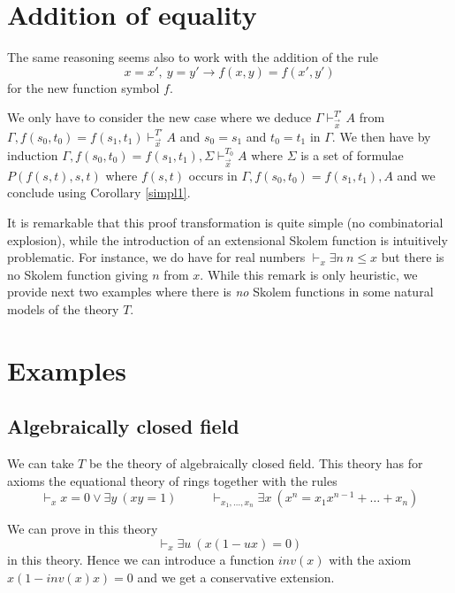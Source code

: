 \documentclass[10pt,a4paper]{article}
\begin{document}

\section{Addition of equality}

 The same reasoning seems also to work with the addition of the rule
$$x=x',~ y = y'\rightarrow f(x,y) = f(x',y')$$
for the new function symbol $f$.

 We only have to consider the new case where we deduce $\Gamma\vdash_{\vec{x}}^{T'} A$ from 
$\Gamma,f(s_0,t_0) = f(s_1,t_1)\vdash_{\vec{x}}^{T'} A$ and $s_0 = s_1$ and
$t_0 = t_1$ in $\Gamma$. We then have by induction
$\Gamma,f(s_0,t_0) = f(s_1,t_1),\Sigma \vdash_{\vec{x}}^{T_0} A$
where  $\Sigma$ is a set of formulae $P(f(s,t),s,t)$ where $f(s,t)$ occurs
in $\Gamma,f(s_0,t_0) = f(s_1,t_1),A$ and we conclude using Corollary \ref{simpl1}.

\medskip

 It is remarkable that this proof transformation is quite simple (no combinatorial explosion), while
the introduction of an extensional Skolem function is intuitively problematic. For instance,
we do have for real numbers $\vdash_x \exists n~n\leqslant x$ but there is no Skolem function
giving $n$ from $x$. While this remark is only heuristic, we provide next two examples where there
is {\em no} Skolem functions in some natural models of the theory $T$.

\section{Examples}

\subsection{Algebraically closed field}

 We can take $T$ be the theory of algebraically closed field. This theory
has for axioms the equational theory of rings together with the rules
$$
\vdash_x x = 0 \vee \exists y~(xy = 1)~~~~~~~~~~~~
\vdash_{x_1,\dots,x_n} \exists x~(x^n = x_1 x^{n-1} + \dots + x_n)
$$

 We can prove in this theory
$$
\vdash_{x} \exists u~ (x(1-ux) = 0)
$$
in this theory. Hence we can introduce a function $inv(x)$ with the axiom
$x(1 -inv(x) x) = 0$ and we get a conservative extension. 
\end{document}
